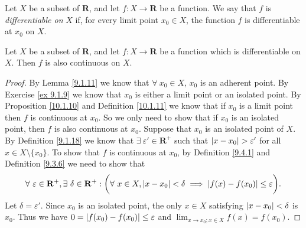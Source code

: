 \begin{definition}\label{10.1.11}
    Let \(X\) be a subset of \(\mathbf{R}\), and let \(f : X \to \mathbf{R}\) be a function.
    We say that \(f\) is \emph{differentiable on} \(X\) if, for every limit point \(x_0 \in X\), the function \(f\) is differentiable at \(x_0\) on \(X\).
\end{definition}

\begin{corollary}\label{10.1.12}
    Let \(X\) be a subset of \(\mathbf{R}\), and let \(f : X \to \mathbf{R}\) be a function which is differentiable on \(X\).
    Then \(f\) is also continuous on \(X\).
\end{corollary}

\begin{proof}
    By Lemma \ref{9.1.11} we know that \(\forall\ x_0 \in X\), \(x_0\) is an adherent point.
    By Exercise \ref{ex 9.1.9} we know that \(x_0\) is either a limit point or an isolated point.
    By Proposition \ref{10.1.10} and Definition \ref{10.1.11} we know that if \(x_0\) is a limit point then \(f\) is continuous at \(x_0\).
    So we only need to show that if \(x_0\) is an isolated point, then \(f\) is also continuous at \(x_0\).
    Suppose that \(x_0\) is an isolated point of \(X\).
    By Definition \ref{9.1.18} we know that \(\exists\ \varepsilon' \in \mathbf{R}^+\) such that \(\abs*{x - x_0} > \varepsilon'\) for all \(x \in X \setminus \{x_0\}\).
    To show that \(f\) is continuous at \(x_0\), by Definition \ref{9.4.1} and Definition \ref{9.3.6} we need to show that
    \[
        \forall\ \varepsilon \in \mathbf{R}^+, \exists\ \delta \in \mathbf{R}^+ : \bigg(\forall\ x \in X, \abs*{x - x_0} < \delta \implies \abs*{f(x) - f(x_0)} \leq \varepsilon\bigg).
    \]
    Let \(\delta = \varepsilon'\).
    Since \(x_0\) is an isolated point, the only \(x \in X\) satisfying \(\abs*{x - x_0} < \delta\) is \(x_0\).
    Thus we have \(0 = \abs*{f(x_0) - f(x_0)} \leq \varepsilon\) and \(\lim_{x \to x_0 ; x \in X} f(x) = f(x_0)\).
\end{proof}

